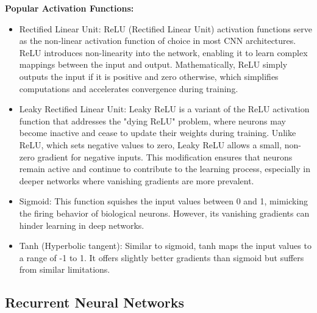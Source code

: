 \documentclass{article}
\begin{document}
\textbf{Popular Activation Functions:}\hfill\newline\\

\begin{itemize}
\item[\ding{118}] Rectified Linear Unit:
ReLU (Rectified Linear Unit) activation functions serve as the non-linear activation function of choice in most CNN architectures. ReLU introduces non-linearity into the network, enabling it to learn complex mappings between the input and output. Mathematically, ReLU simply outputs the input if it is positive and zero otherwise, which simplifies computations and accelerates convergence during training.
\end{itemize}

\begin{itemize}
\item[\ding{118}] Leaky Rectified Linear Unit:
Leaky ReLU is a variant of the ReLU activation function that addresses the "dying ReLU" problem, where neurons may become inactive and cease to update their weights during training. Unlike ReLU, which sets negative values to zero, Leaky ReLU allows a small, non-zero gradient for negative inputs. This modification ensures that neurons remain active and continue to contribute to the learning process, especially in deeper networks where vanishing gradients are more prevalent.
\end{itemize}

\begin{itemize}
\item[\ding{118}] Sigmoid:
This function squishes the input values between 0 and 1, mimicking the firing behavior of biological neurons. However, its vanishing gradients can hinder learning in deep networks.
\end{itemize}

\begin{itemize}
\item[\ding{118}] Tanh (Hyperbolic tangent):
Similar to sigmoid, tanh maps the input values to a range of -1 to 1. It offers slightly better gradients than sigmoid but suffers from similar limitations.
\end{itemize}

\subsection{Recurrent Neural Networks}
\end{document}
